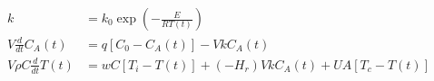 \begin{equation}
  \begin{aligned}
    k                         & = k_0 \exp(-\frac{E}{RT(t)})
    \\
    V\frac{d}{dt}C_A(t)       & = q [C_0 - C_A(t)] - V k C_A(t)
    \\
    V \rho C \frac{d}{dt}T(t) & = w C [T_i - T(t)] + (- H_r) V k C_A(t) + U A [T_c - T(t)]
  \end{aligned}
  \label{eq:CSTR_1storder01_1}
\end{equation}